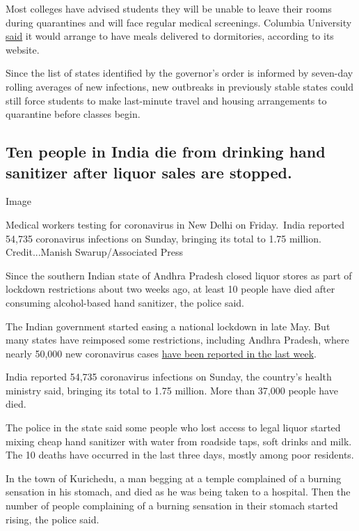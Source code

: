 Most colleges have advised students they will be unable to leave their
rooms during quarantines and will face regular medical screenings.
Columbia University
\href{https://roomselection.housing.columbia.edu/}{said} it would
arrange to have meals delivered to dormitories, according to its
website.

Since the list of states identified by the governor's order is informed
by seven-day rolling averages of new infections, new outbreaks in
previously stable states could still force students to make last-minute
travel and housing arrangements to quarantine before classes begin.

\hypertarget{ten-people-in-india-die-from-drinking-hand-sanitizer-after-liquor-sales-are-stopped}{%
\subsection{Ten people in India die from drinking hand sanitizer after
liquor sales are
stopped.}\label{ten-people-in-india-die-from-drinking-hand-sanitizer-after-liquor-sales-are-stopped}}

Image

Medical workers testing for coronavirus in New Delhi on Friday.~India
reported 54,735 coronavirus infections on Sunday, bringing its total to
1.75 million. Credit...Manish Swarup/Associated Press

Since the southern Indian state of Andhra Pradesh closed liquor stores
as part of lockdown restrictions about two weeks ago, at least 10 people
have died after consuming alcohol-based hand sanitizer, the police said.

The Indian government started easing a national lockdown in late May.
But many states have reimposed some restrictions, including Andhra
Pradesh, where nearly 50,000 new coronavirus cases
\href{https://www.nytimes.com/interactive/2020/world/asia/india-coronavirus-cases.html\#cases}{have
been reported in the last week}.

India reported 54,735 coronavirus infections on Sunday, the country's
health ministry said, bringing its total to 1.75 million. More than
37,000 people have died.

The police in the state said some people who lost access to legal liquor
started mixing cheap hand sanitizer with water from roadside taps, soft
drinks and milk. The 10 deaths have occurred in the last three days,
mostly among poor residents.

In the town of Kurichedu, a man begging at a temple complained of a
burning sensation in his stomach, and died as he was being taken to a
hospital. Then the number of people complaining of a burning sensation
in their stomach started rising, the police said.


